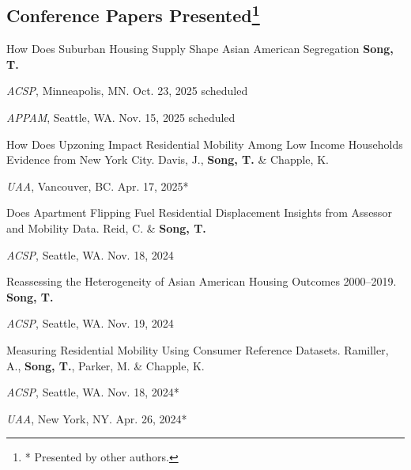 \documentclass[10pt,letterpaper]{article}
\newcommand{\listitemspace}{0.25em}
\renewenvironment{itemize}
{\begin{list}{}{\setlength{\leftmargin}{1em}
\setlength{\parskip}{0em}
\setlength{\itemsep}{\listitemspace}
\setlength{\parsep}{\listitemspace}}}
{\end{list}}
\begin{document}
\subsection{Conference Papers Presented\footnote{* Presented by other authors.}}
\begin{itemize}
  \item How Does Suburban Housing Supply Shape Asian American Segregation \textbf{Song, T.}
    \begin{itemize}
      \addtolength{\leftskip}{1em}
      \setlength{\itemsep}{-0.4em}
      \item[•] \emph{ACSP}, Minneapolis, MN. Oct. 23, 2025 scheduled
      \item[•] \emph{APPAM}, Seattle, WA. Nov. 15, 2025 scheduled
    \end{itemize}

  \item How Does Upzoning Impact Residential Mobility Among Low Income Households Evidence from New York City. Davis, J., \textbf{Song, T.} \& Chapple, K.
    \begin{itemize}
      \addtolength{\leftskip}{1em}
      \setlength{\itemsep}{-0.4em}
      \item[•] \emph{UAA}, Vancouver, BC. Apr. 17, 2025*
    \end{itemize}

  \item Does Apartment Flipping Fuel Residential Displacement Insights from Assessor and Mobility Data. Reid, C. \& \textbf{Song, T.}
    \begin{itemize}
      \addtolength{\leftskip}{1em}
      \setlength{\itemsep}{-0.4em}
      \item[•] \emph{ACSP}, Seattle, WA. Nov. 18, 2024
    \end{itemize}

  \item Reassessing the Heterogeneity of Asian American Housing Outcomes 2000–2019. \textbf{Song, T.}
    \begin{itemize}
      \addtolength{\leftskip}{1em}
      \setlength{\itemsep}{-0.4em}
      \item[•] \emph{ACSP}, Seattle, WA. Nov. 19, 2024
    \end{itemize}

  \item Measuring Residential Mobility Using Consumer Reference Datasets. Ramiller, A., \textbf{Song, T.}, Parker, M. \& Chapple, K.
    \begin{itemize}
      \addtolength{\leftskip}{1em}
      \setlength{\itemsep}{-0.4em}
      \item[•] \emph{ACSP}, Seattle, WA. Nov. 18, 2024*
      \item[•] \emph{UAA}, New York, NY. Apr. 26, 2024*
    \end{itemize}


\end{itemize}
\end{document}
